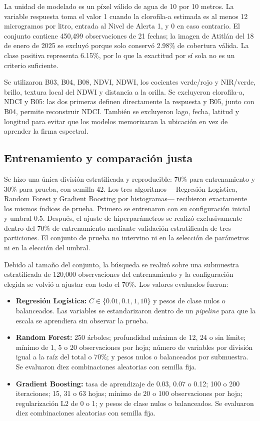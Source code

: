 \documentclass[10pt,a4paper]{article}
\begin{document}
La unidad de modelado es un píxel válido de agua de 10 por 10 metros. La variable respuesta toma el valor 1 cuando
la clorofila-a estimada es al menos 12 microgramos por litro, entrada al Nivel de Alerta 1, y 0 en caso contrario.
El conjunto contiene 450,499 observaciones de 21 fechas; la imagen de Atitlán del 18 de enero de 2025 se excluyó
porque solo conservó 2.98\% de cobertura válida. La clase positiva representa 6.15\%, por lo que la exactitud por sí
sola no es un criterio suficiente.

Se utilizaron B03, B04, B08, NDVI, NDWI, los cocientes verde/rojo y NIR/verde, brillo, textura local del NDWI y
distancia a la orilla. Se excluyeron clorofila-a, NDCI y B05: las dos primeras definen directamente la respuesta y
B05, junto con B04, permite reconstruir NDCI. También se excluyeron lago, fecha, latitud y longitud para evitar que
los modelos memorizaran la ubicación en vez de aprender la firma espectral.

\subsection{Entrenamiento y comparación justa}

Se hizo una única división estratificada y reproducible: 70\% para entrenamiento y 30\% para prueba, con semilla 42.
Los tres algoritmos ---Regresión Logística, Random Forest y Gradient Boosting por histogramas--- recibieron
exactamente los mismos índices de prueba. Primero se entrenaron con su configuración inicial y umbral 0.5. Después,
el ajuste de hiperparámetros se realizó exclusivamente dentro del 70\% de entrenamiento mediante validación
estratificada de tres particiones. El conjunto de prueba no intervino ni en la selección de parámetros ni en la
elección del umbral.

Debido al tamaño del conjunto, la búsqueda se realizó sobre una submuestra estratificada de 120,000 observaciones
del entrenamiento y la configuración elegida se volvió a ajustar con todo el 70\%. Los valores evaluados fueron:

\begin{itemize}
  \item \textbf{Regresión Logística:} $C\in\{0.01,0.1,1,10\}$ y pesos de clase nulos o balanceados. Las variables
  se estandarizaron dentro de un \textit{pipeline} para que la escala se aprendiera sin observar la prueba.
  \item \textbf{Random Forest:} 250 árboles; profundidad máxima de 12, 24 o sin límite; mínimo de 1, 5 o 20
  observaciones por hoja; número de variables por división igual a la raíz del total o 70\%; y pesos nulos o
  balanceados por submuestra. Se evaluaron diez combinaciones aleatorias con semilla fija.
  \item \textbf{Gradient Boosting:} tasa de aprendizaje de 0.03, 0.07 o 0.12; 100 o 200 iteraciones; 15, 31 o 63
  hojas; mínimo de 20 o 100 observaciones por hoja; regularización L2 de 0 o 1; y pesos de clase nulos o balanceados.
  Se evaluaron diez combinaciones aleatorias con semilla fija.
\end{itemize}
\end{document}
